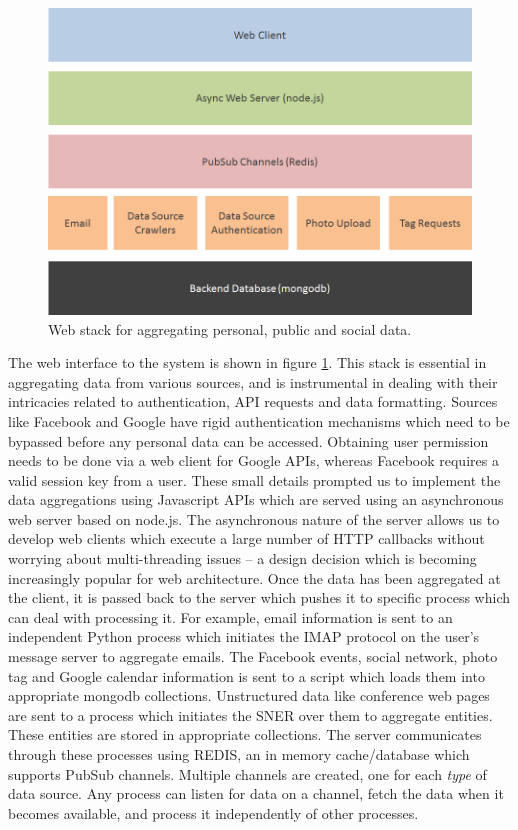 \begin{figure}[h]
\centering
\includegraphics[width=\textwidth]{media/chapter4/web-stack.png}
\caption{Web stack for aggregating personal, public and social data.}
\label{fig:web-stack}
\end{figure}

The web interface to the system is shown in figure \ref{fig:web-stack}. This stack is essential in aggregating data from various sources, and is instrumental in dealing with their intricacies related to authentication, API requests and data formatting. Sources like Facebook and Google have rigid authentication mechanisms which need to be bypassed before any personal data can be accessed. Obtaining user permission needs to be done via a web client for Google APIs, whereas Facebook requires a valid session key from a user. These small details prompted us to implement the data aggregations using Javascript APIs which are served using an asynchronous web server based on node.js. The asynchronous nature of the server allows us to develop web clients which execute a large number of HTTP callbacks without worrying about multi-threading issues -- a design decision which is becoming increasingly popular for web architecture. Once the data has been aggregated at the client, it is passed back to the server which pushes it to specific process which can deal with processing it. For example, email information is sent to an independent Python process which initiates the IMAP protocol on the user's message server to aggregate emails. The Facebook events, social network, photo tag and Google calendar information is sent to a script which loads them into appropriate mongodb collections. Unstructured data like conference web pages are sent to a process which initiates the SNER over them to aggregate entities. These entities are stored in appropriate collections. The server communicates through these processes using REDIS, an in memory cache/database which supports PubSub channels. Multiple channels are created, one for each \textit{type} of data source. Any process can listen for data on a channel, fetch the data when it becomes available, and process it independently of other processes.

